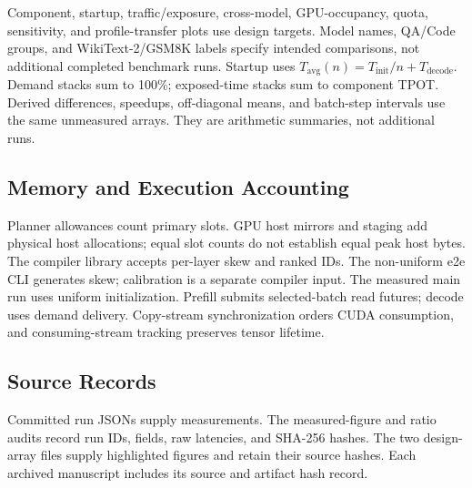 \documentclass[conference,9pt,letterpaper]{IEEEtran}
\begin{document}
Component, startup, traffic/exposure, cross-model, GPU-occupancy, quota, sensitivity, and profile-transfer plots use design targets. Model names, QA/Code groups, and WikiText-2/GSM8K labels specify intended comparisons, not additional completed benchmark runs. Startup uses $T_{\mathrm{avg}}(n)=T_{\mathrm{init}}/n+T_{\mathrm{decode}}$. Demand stacks sum to 100\%; exposed-time stacks sum to component TPOT. Derived differences, speedups, off-diagonal means, and batch-step intervals use the same unmeasured arrays. They are arithmetic summaries, not additional runs.

\subsection{Memory and Execution Accounting}
Planner allowances count primary slots. GPU host mirrors and staging add physical host allocations; equal slot counts do not establish equal peak host bytes. The compiler library accepts per-layer skew and ranked IDs. The non-uniform e2e CLI generates skew; calibration is a separate compiler input. The measured main run uses uniform initialization. Prefill submits selected-batch read futures; decode uses demand delivery. Copy-stream synchronization orders CUDA consumption, and consuming-stream tracking preserves tensor lifetime.

\subsection{Source Records}
Committed run JSONs supply measurements. The measured-figure and ratio audits record run IDs, fields, raw latencies, and SHA-256 hashes. The two design-array files supply highlighted figures and retain their source hashes. Each archived manuscript includes its source and artifact hash record.
\end{document}
